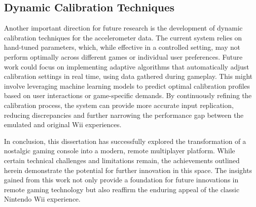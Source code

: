 \subsection{Dynamic Calibration Techniques}
Another important direction for future research is the development of dynamic
calibration techniques for the accelerometer data. The current system relies on
hand-tuned parameters, which, while effective in a controlled setting, may not
perform optimally across different games or individual user preferences. Future
work could focus on implementing adaptive algorithms that automatically adjust
calibration settings in real time, using data gathered during gameplay. This
might involve leveraging machine learning models to predict optimal calibration
profiles based on user interactions or game-specific demands. By continuously
refining the calibration process, the system can provide more accurate input
replication, reducing discrepancies and further narrowing the performance gap
between the emulated and original Wii experiences.


In conclusion, this dissertation has successfully explored the transformation of
a nostalgic gaming console into a modern, remote multiplayer platform.  While
certain technical challenges and limitations remain, the achievements outlined
herein demonstrate the potential for further innovation in this space. The
insights gained from this work not only provide a foundation for future
innovations in remote gaming technology but also reaffirm the enduring appeal of
the classic Nintendo Wii experience.
